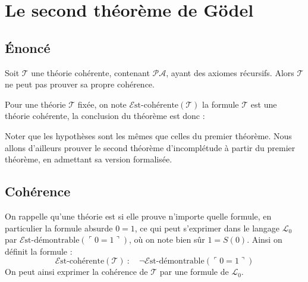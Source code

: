 \documentclass[11pt,class=report,crop=false]{standalone}
\begin{document}



\section{Le second théorème de Gödel}

\subsection{Énoncé}

\begin{theoreme}
Soit $\mathcal{T}$ une théorie cohérente, contenant $\mathcal{PA}$, ayant des axiomes récursifs. Alors $\mathcal{T}$ ne peut pas prouver sa propre cohérence.
\end{theoreme}

Pour une théorie $\mathcal{T}$ fixée, on note $\mathcal{E}\text{st-cohérente}(\mathcal{T})$ la formule \og{}$\mathcal{T}$ est une théorie cohérente\fg{}, la conclusion du théorème est donc :

Noter que les hypothèses sont les mêmes que celles du premier théorème. Nous allons d'ailleurs prouver le second théorème d'incomplétude à partir du premier théorème, en admettant sa version formalisée.

\subsection{Cohérence}


On rappelle qu'une théorie est  si elle prouve n'importe quelle formule, en particulier la formule absurde \og$0=1$\fg{}, ce qui peut s'exprimer dans le langage $\mathcal{L}_0$ par $\mathcal{E}\text{st-démontrable}(\ulcorner 0=1 \urcorner)$, où on note bien sûr $1 = S(0)$. Ainsi on définit la formule :
\[
  \mathcal{E}\text{st-cohérente}(\mathcal{T}) \ : \quad \lnot \mathcal{E}\text{st-démontrable}(\ulcorner 0=1 \urcorner)
\]
On peut ainsi exprimer la cohérence de $\mathcal{T}$ par une formule de $\mathcal{L}_0$.
\end{document}

